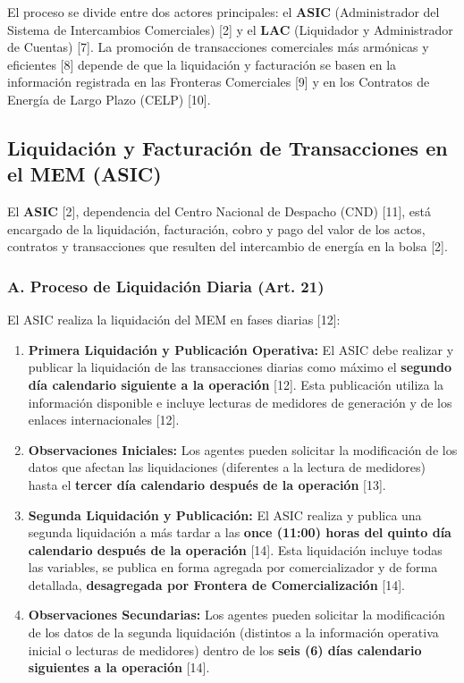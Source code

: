 \documentclass[a5paper]{book}%
\begin{document}
  El proceso se divide entre dos actores principales: el \textbf{ASIC} (Administrador del Sistema de Intercambios Comerciales) [2] y el \textbf{LAC} (Liquidador y Administrador de Cuentas) [7]. La promoción de transacciones comerciales más armónicas y eficientes [8] depende de que la liquidación y facturación se basen en la información registrada en las Fronteras Comerciales [9] y en los Contratos de Energía de Largo Plazo (CELP) [10].
  
  \subsection{Liquidación y Facturación de Transacciones en el MEM (ASIC)}
  
  El \textbf{ASIC} [2], dependencia del Centro Nacional de Despacho (CND) [11], está encargado de la liquidación, facturación, cobro y pago del valor de los actos, contratos y transacciones que resulten del intercambio de energía en la bolsa [2].
  
  \subsubsection*{A. Proceso de Liquidación Diaria (Art. 21)}
  El ASIC realiza la liquidación del MEM en fases diarias [12]:
  
  \begin{enumerate}
  	\item \textbf{Primera Liquidación y Publicación Operativa:} El ASIC debe realizar y publicar la liquidación de las transacciones diarias como máximo el \textbf{segundo día calendario siguiente a la operación} [12]. Esta publicación utiliza la información disponible e incluye lecturas de medidores de generación y de los enlaces internacionales [12].
  	\item \textbf{Observaciones Iniciales:} Los agentes pueden solicitar la modificación de los datos que afectan las liquidaciones (diferentes a la lectura de medidores) hasta el \textbf{tercer día calendario después de la operación} [13].
  	\item \textbf{Segunda Liquidación y Publicación:} El ASIC realiza y publica una segunda liquidación a más tardar a las \textbf{once (11:00) horas del quinto día calendario después de la operación} [14]. Esta liquidación incluye todas las variables, se publica en forma agregada por comercializador y de forma detallada, \textbf{desagregada por Frontera de Comercialización} [14].
  	\item \textbf{Observaciones Secundarias:} Los agentes pueden solicitar la modificación de los datos de la segunda liquidación (distintos a la información operativa inicial o lecturas de medidores) dentro de los \textbf{seis (6) días calendario siguientes a la operación} [14].
  \end{enumerate}
  
\end{document}
